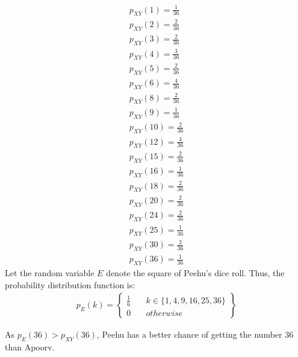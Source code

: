 \documentclass[journal,12pt,twocolumn]{IEEEtran}
\theoremstyle{remark}
\begin{document}
\begin{align}
p_{XY}(1) = \frac{1}{36}\\
p_{XY}(2) = \frac{2}{36}\\
p_{XY}(3) = \frac{2}{36}\\
p_{XY}(4) = \frac{3}{36}\\
p_{XY}(5) = \frac{2}{36}\\
p_{XY}(6) = \frac{4}{36}\\
p_{XY}(8) = \frac{2}{36}\\
p_{XY}(9) = \frac{1}{36}\\
p_{XY}(10) = \frac{2}{36}\\
p_{XY}(12) = \frac{4}{36}\\
p_{XY}(15) = \frac{2}{36}\\
p_{XY}(16) = \frac{1}{36}\\
p_{XY}(18) = \frac{2}{36}\\
p_{XY}(20) = \frac{2}{36}\\
p_{XY}(24) = \frac{2}{36}\\
p_{XY}(25) = \frac{1}{36}\\
p_{XY}(30) = \frac{2}{36}\\
p_{XY}(36) = \frac{1}{36}
\end{align}
Let the random variable $E$ denote the square of Peehu's dice roll. Thus, the probability distribution function is:
\begin{align}
   p_E(k) = \left \{
   \begin{array}{cc}
      \frac{1}{6} & \quad k \in \{1, 4, 9, 16, 25, 36\} \\
      0 & \quad otherwise
   \end{array}
   \right \}
\end{align}

As $p_{E}(36) > p_{XY}(36)$, Peehu has a better chance of getting the number 36 than Apoorv.
\end{document}
